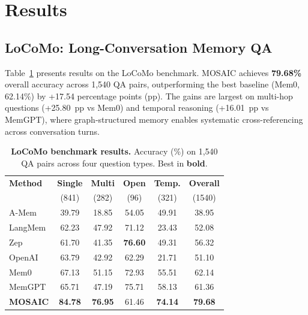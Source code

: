 \documentclass[10pt,twocolumn]{article}
\begin{document}
\section{Results}
\label{sec:results}

\subsection{LoCoMo: Long-Conversation Memory QA}
\label{sec:results_locomo}

Table~\ref{tab:locomo} presents results on the LoCoMo benchmark.
MOSAIC achieves \textbf{79.68\%} overall accuracy across 1,540 QA pairs,
outperforming the best baseline (Mem0, 62.14\%) by +17.54 percentage points
(pp). The gains are largest on multi-hop questions (+25.80~pp vs Mem0) and
temporal reasoning (+16.01~pp vs MemGPT), where graph-structured memory
enables systematic cross-referencing across conversation turns.

\begin{table}[!t]
\centering
\caption{\textbf{LoCoMo benchmark results.} Accuracy (\%) on 1,540 QA pairs
across four question types. Best in \textbf{bold}.}
\label{tab:locomo}
\small
\setlength{\tabcolsep}{3.5pt}
\begin{tabular}{@{}lccccc@{}}
\toprule
\textbf{Method} & \textbf{Single} & \textbf{Multi} & \textbf{Open} & \textbf{Temp.} & \textbf{Overall} \\
& (841) & (282) & (96) & (321) & (1540) \\
\midrule
A-Mem     & 39.79 & 18.85 & 54.05 & 49.91 & 38.95 \\
LangMem   & 62.23 & 47.92 & 71.12 & 23.43 & 52.08 \\
Zep       & 61.70 & 41.35 & \textbf{76.60} & 49.31 & 56.32 \\
OpenAI    & 63.79 & 42.92 & 62.29 & 21.71 & 51.10 \\
Mem0      & 67.13 & 51.15 & 72.93 & 55.51 & 62.14 \\
MemGPT    & 65.71 & 47.19 & 75.71 & 58.13 & 61.36 \\
\midrule
\textbf{MOSAIC} & \textbf{84.78} & \textbf{76.95} & 61.46 & \textbf{74.14} & \textbf{79.68} \\
\bottomrule
\end{tabular}
\end{table}
\end{document}
